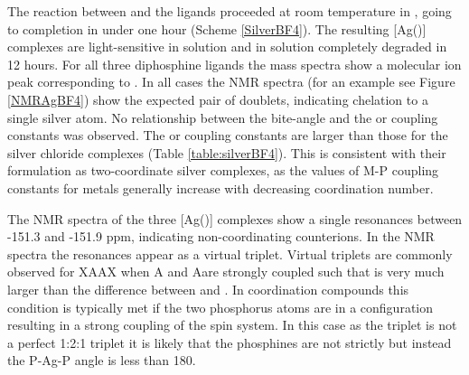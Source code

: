 The reaction between  and the \tBuxantphos{} ligands proceeded at room temperature in , going to completion in under one hour (Scheme \ref{SilverBF4}).  The resulting [Ag(\tBuxantphos)] complexes are light-sensitive in solution and in  solution completely degraded in 12 hours.  For all three diphosphine ligands the mass spectra show a molecular ion peak corresponding to \ce{[Ag(diphosphine)]+}. In all cases the \phosphorus{} NMR spectra (for an example see Figure \ref{NMRAgBF4}) show the expected pair of doublets, indicating chelation to a single silver atom.  No relationship between the bite-angle and the \JAgPseven{} or \JAgPnine{} coupling constants was observed.  The \JAgPseven{} or \JAgPnine{} coupling constants are larger than those for the silver chloride complexes (Table \ref{table:silverBF4}).  This is consistent with their formulation as two-coordinate silver complexes, as the values of M-P coupling constants for  metals generally increase with decreasing coordination number.

The \fluorine{} NMR spectra of the three [Ag(\tBuxantphos)] complexes show a single resonances between -151.3 and -151.9 ppm, indicating non-coordinating  counterions.  In the \proton{} NMR spectra the \tBu{} resonances appear as a virtual triplet.  Virtual triplets are commonly observed for XAA\textprime{}X\textprime{} when A and A\textprime are strongly coupled such that  is very much larger than the difference between  and .\cite{Harris1964}  In coordination compounds this condition is typically met if the two phosphorus atoms are in a \trans{} configuration resulting in a strong coupling of the spin system.  In this case as the triplet is not a perfect 1:2:1 triplet it is likely that the phosphines are not strictly \trans{} but instead the P-Ag-P angle is less than 180\degrees{}.  

